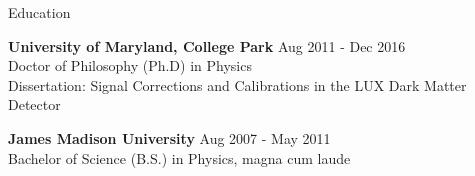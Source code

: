\documentclass{resume} %
\begin{document}

\begin{rSection}{Education}

{\bf University of Maryland, College Park} \hfill {Aug 2011 - Dec 2016} \\ 
Doctor of Philosophy (Ph.D) in Physics \\
Dissertation: Signal Corrections and Calibrations in the LUX Dark Matter Detector

{\bf James Madison University} \hfill {Aug 2007 - May 2011} \\ 
Bachelor of Science (B.S.) in Physics, magna cum laude \\

\vspace{-1em}

\end{rSection}

\end{document}
